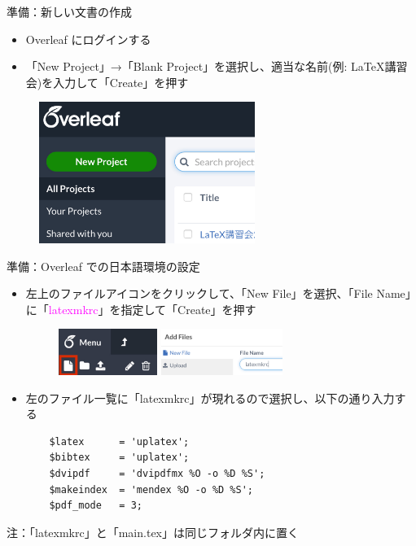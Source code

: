 \documentclass[dvipdfmx]{beamer}
\begin{document}
\begin{frame}[fragile]{準備：新しい文書の作成}
\begin{itemize}
    \item Overleaf にログインする
    \item 「New Project」→「Blank Project」を選択し、適当な名前(例: LaTeX講習会)を入力して「Create」を押す
\end{itemize}
\begin{figure}
    \centering
    \includegraphics[width=7cm,pagebox=cropbox,clip]{./figures/NewDocument.pdf}
\end{figure}
\end{frame}

\begin{frame}[fragile]{準備：Overleaf での日本語環境の設定}
\begin{itemize}
    \item 左上のファイルアイコンをクリックして、「New File」を選択、「File Name」に「\textcolor{magenta}{latexmkrc}」を指定して「Create」を押す
    \begin{figure}
        \centering
        \includegraphics[height=1.5cm]{./figures/fig_new_file.jpg}
        \qquad
        \includegraphics[height=1.5cm]{./figures/fig_latexmkrc.pdf}
    \end{figure}
    
    \item 左のファイル一覧に「latexmkrc」が現れるので選択し、以下の通り入力する
    \begin{verbatim}
    $latex      = 'uplatex';
    $bibtex     = 'uplatex';
    $dvipdf     = 'dvipdfmx %O -o %D %S';
    $makeindex  = 'mendex %O -o %D %S';
    $pdf_mode   = 3;
    \end{verbatim}
\end{itemize}
\alert{注}：「latexmkrc」と「main.tex」は同じフォルダ内に置く
\end{frame}
\end{document}
